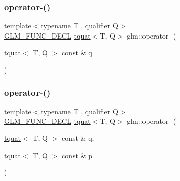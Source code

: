 \subsubsection{\texorpdfstring{operator-\/()}{operator-()}\hspace{0.1cm}{\footnotesize\ttfamily [1/2]}}
{\footnotesize\ttfamily template$<$typename T , qualifier Q$>$ \\
\hyperlink{setup_8hpp_ab2d052de21a70539923e9bcbf6e83a51}{G\+L\+M\+\_\+\+F\+U\+N\+C\+\_\+\+D\+E\+CL} \hyperlink{structglm_1_1tquat}{tquat}$<$T, Q$>$ glm\+::operator-\/ (\begin{DoxyParamCaption}\item[{\hyperlink{structglm_1_1tquat}{tquat}$<$ T, Q $>$ const \&}]{q }\end{DoxyParamCaption})}

\mbox{\label{group__gtc__quaternion_ga004ef8d57d8c50ec4356e2b8a43e93af}} 
\subsubsection{\texorpdfstring{operator-\/()}{operator-()}\hspace{0.1cm}{\footnotesize\ttfamily [2/2]}}
{\footnotesize\ttfamily template$<$typename T , qualifier Q$>$ \\
\hyperlink{setup_8hpp_ab2d052de21a70539923e9bcbf6e83a51}{G\+L\+M\+\_\+\+F\+U\+N\+C\+\_\+\+D\+E\+CL} \hyperlink{structglm_1_1tquat}{tquat}$<$T, Q$>$ glm\+::operator-\/ (\begin{DoxyParamCaption}\item[{\hyperlink{structglm_1_1tquat}{tquat}$<$ T, Q $>$ const \&}]{q,  }\item[{\hyperlink{structglm_1_1tquat}{tquat}$<$ T, Q $>$ const \&}]{p }\end{DoxyParamCaption})}

\mbox{\label{group__gtc__quaternion_ga077354a34d5111b6c904db7bf331a31f}} 
